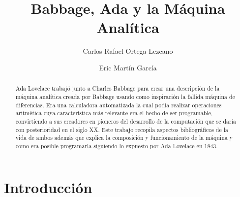 \documentclass[runningheads,a4paper]{llncs}
\begin{document}
\mainmatter  %

\title{Babbage, Ada y la Máquina Analítica}


%
%
\author{Carlos Rafael Ortega Lezcano \and Eric Martín García}
%


%
%

\maketitle


\begin{abstract}
Ada Lovelace trabajó junto a Charles Babbage para crear una descripción de la máquina analítica creada por Babbage 
usando como inspiración la fallida máquina de diferencias. Era una calculadora automatizada la cual podía realizar
operaciones aritmética cuya característica más relevante era el hecho de ser programable, convirtiendo a sus creadores
en pioneros del desarrollo de la computación que se daría con posterioridad en el siglo XX. Este trabajo recopila aspectos bibliográficos de la vida de ambos además que explica la composición y funcionamiento de la máquina y como era posible programarla siguiendo lo expuesto por Ada Lovelace en 1843.
\end{abstract}


\section{Introducción}
\end{document}
